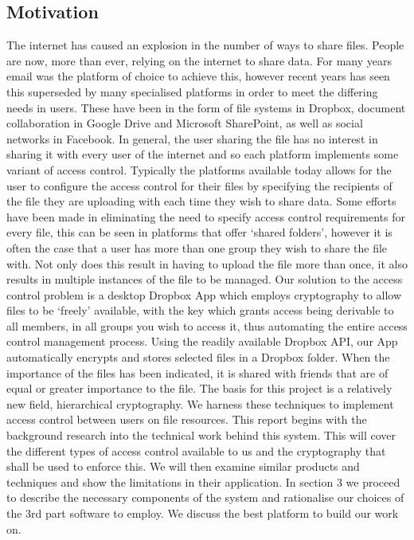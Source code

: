 \documentclass[12pt, titlepage]{article}
\begin{document}
\subsection{Motivation}
The internet has caused an explosion in the number of ways to share files. People are now, more than ever, relying on the internet to share data. For many years email was the platform of choice to achieve this, however recent years has seen this superseded by many specialised platforms in order to meet the differing needs in users. These have been in the form of file systems in Dropbox, document collaboration in Google Drive and Microsoft SharePoint, as well as social networks in Facebook. In general, the user sharing the file has no interest in sharing it with every user of the internet and so each platform implements some variant of access control. Typically the platforms available today allows for the user to configure the access control for their files by specifying the recipients of the file they are uploading with each time they wish to share data. Some efforts have been made in eliminating the need to specify access control requirements for every file, this can be seen in platforms that offer `shared folders', however it is often the case that a user has more than one group they wish to share the file with. Not only does this result in having to upload the file more than once, it also results in multiple instances of the file to be managed. Our solution to the access control problem is a desktop Dropbox App which employs cryptography to allow files to be `freely' available, with the key which grants access being derivable to all members, in all groups you wish to access it, thus automating the entire access control management process. Using the readily available Dropbox API, our App automatically encrypts and stores selected files in a Dropbox folder. When the importance of the files has been indicated, it is shared with friends that are of equal or greater importance to the file.
\newline \indent The basis for this project is a relatively new field, hierarchical cryptography. We harness these techniques to implement access control between users on file resources.
\newline
\newline \indent This report begins with the background research into the technical work behind this system. This will cover the different types of access control available to us and the cryptography that shall be used to enforce this. We will then examine similar products and techniques and show the limitations in their application. In section 3 we proceed to describe the necessary components of the system and rationalise our choices of the 3rd part software to employ. We discuss the best platform to build our work on.
\end{document}

